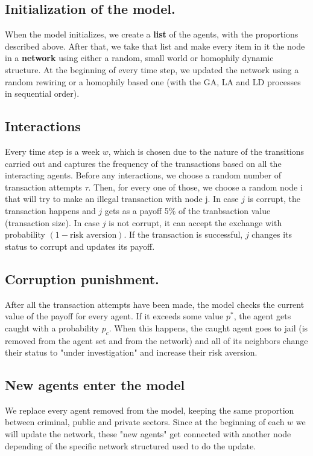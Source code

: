 \documentclass[letterpaper, 11pt]{article}
\begin{document}
\subsection{Initialization of the model.}
\label{sec:org58dacc7}
When the model initializes, we create a \textbf{list} of the agents, with the proportions described above. After that, we take that list and make every item in it the node in a \textbf{network} using either a random, small world or homophily dynamic structure. At the beginning of every time step, we updated the network using a random rewiring or a homophily based one (with the GA, LA and LD processes in sequential order).

\subsection{Interactions}
\label{sec:orgb0b6b88}
Every time step is a week \(w\), which is chosen due to the nature of the transitions carried out and captures the frequency of the transactions based on all the interacting agents. Before any interactions, we choose a random number of transaction attempts \(\tau\). Then, for every one of those, we choose a random node i that will try to make an illegal transaction with node j. In case \(j\) is corrupt, the transaction happens and \(j\) gets as a payoff 5\% of the tranbsaction value (transaction size). In case \(j\) is not corrupt, it can accept the exchange with probability \((1 - \text{risk aversion})\). If the transaction is successful, \(j\) changes its status to corrupt and updates its payoff.

\subsection{Corruption punishment.}
\label{sec:org1a97377}
After all the transaction attempts have been made, the model checks the current value of the payoff for every agent. If it exceeds some value \(p^{*}\), the agent gets caught with a probability \(p_{c}\). When this happens, the caught agent goes to jail (is removed from the agent set and from the network) and all of its neighbors change their status to "under investigation" and increase their risk aversion. 

\subsection{New agents enter the model}
\label{sec:orgfd0cdde}
We replace every agent removed from the model, keeping the same proportion between criminal, public and private sectors. Since at the beginning of each \(w\) we will update the network, these "new agents" get connected with another node depending of the specific network structured used to do the update. 
\end{document}

